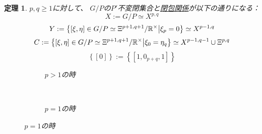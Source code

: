 \documentclass[10pt]{msjproc} %
\newtheorem{theorem}{定理}
\begin{document}
\begin{theorem}
$p, q \geqslant 1$に対して、
  $G/P$の$P'$不変閉集合と\uline{閉包関係}が以下の通りになる：\\
  \[X:=G/P\simeq X^{p,q}\]
  \[Y:=\left\{[\xi,\eta]\in G/P\simeq\Xi^{p+1,q+1}/\mathbb{R}^\times\big| \xi_{p}=0\right\}\simeq X^{p-1,q}\]
  \[C:=\left\{[\xi,\eta]\in G/P\simeq\Xi^{p+1,q+1}/\mathbb{R}^\times \big| \xi_{0}=\eta_q\right\}\simeq X^{p-1,q-1}\cup\Xi^{p,q}\]
  \[\left\{ [0] \right\}:=\left\{ [1,0_{p+q},1] \right\}\]
  \begin{figure}[H]
    \centering
    \begin{subfigure}{0.3\textwidth}
	\caption{$p>1$の時}
    \end{subfigure}
    ~ %
    \begin{subfigure}{0.3\textwidth}
	\raisebox{40mm}
	{}
	\caption{$p=1$の時}
    \end{subfigure}
\end{figure}
\end{theorem}
\end{document}

